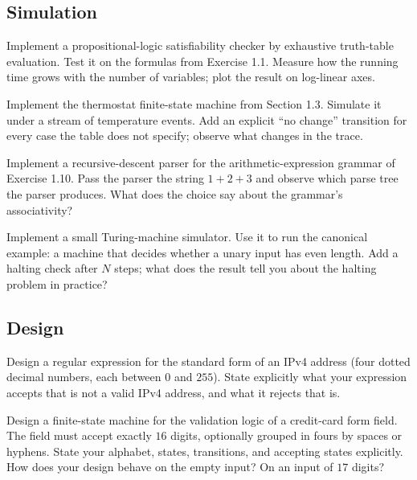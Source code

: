 \subsection*{Simulation}

\begin{exercise}
Implement a propositional-logic satisfiability checker by exhaustive truth-table evaluation. Test it on the formulas from Exercise 1.1. Measure how the running time grows with the number of variables; plot the result on log-linear axes.
\end{exercise}

\begin{exercise}
Implement the thermostat finite-state machine from Section 1.3. Simulate it under a stream of temperature events. Add an explicit ``no change'' transition for every case the table does not specify; observe what changes in the trace.
\end{exercise}

\begin{exercise}
Implement a recursive-descent parser for the arithmetic-expression grammar of Exercise 1.10. Pass the parser the string $1 + 2 + 3$ and observe which parse tree the parser produces. What does the choice say about the grammar's associativity?
\end{exercise}

\begin{exercise}
Implement a small Turing-machine simulator. Use it to run the canonical example: a machine that decides whether a unary input has even length. Add a halting check after $N$ steps; what does the result tell you about the halting problem in practice?
\end{exercise}

\subsection*{Design}

\begin{exercise}
Design a regular expression for the standard form of an IPv4 address (four dotted decimal numbers, each between $0$ and $255$). State explicitly what your expression accepts that is not a valid IPv4 address, and what it rejects that is.
\end{exercise}

\begin{exercise}
Design a finite-state machine for the validation logic of a credit-card form field. The field must accept exactly $16$ digits, optionally grouped in fours by spaces or hyphens. State your alphabet, states, transitions, and accepting states explicitly. How does your design behave on the empty input? On an input of $17$ digits?
\end{exercise}

